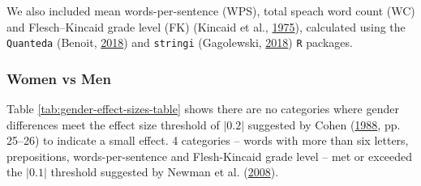 \documentclass[]{article}
\theoremstyle{definition}
\theoremstyle{definition}
\theoremstyle{definition}
\theoremstyle{remark}
\begin{document}
We also included mean words-per-sentence (WPS), total speach word count
(WC) and Flesch--Kincaid grade level (FK) (Kincaid et al.,
\protect\hyperlink{ref-kincaid1975}{1975}), calculated using the
\texttt{Quanteda} (Benoit, \protect\hyperlink{ref-benoit2018}{2018}) and
\texttt{stringi} (Gagolewski,
\protect\hyperlink{ref-gagolewski2018}{2018}) \texttt{R} packages.

\hypertarget{women-vs-men}{%
\subsubsection{Women vs Men}\label{women-vs-men}}

Table \ref{tab:gender-effect-sizes-table} shows there are no categories
where gender differences meet the effect size threshold of \(|0.2|\)
suggested by Cohen (\protect\hyperlink{ref-cohen1988}{1988}, pp. 25--26)
to indicate a small effect. 4 categories -- words with more than six
letters, prepositions, words-per-sentence and Flesh-Kincaid grade level
-- met or exceeded the \(|0.1|\) threshold suggested by Newman et al.
(\protect\hyperlink{ref-newman2008}{2008}).
\end{document}
